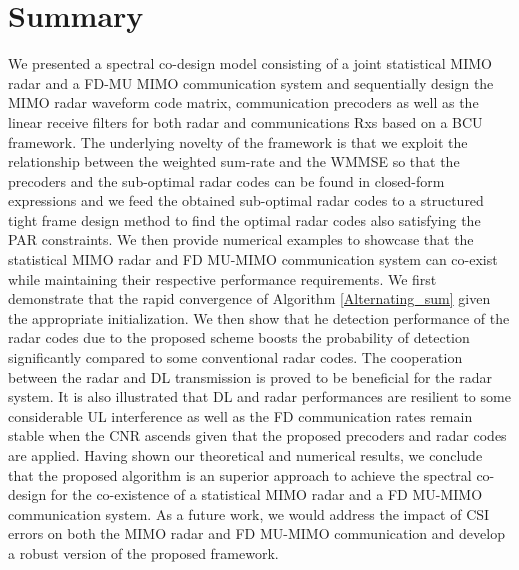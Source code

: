 \documentclass[9pt,journal]{IEEEtran}
\begin{document}
\section{Summary}
\label{sec:conclusion}
We presented a spectral co-design model consisting of a joint statistical MIMO radar and a FD-MU MIMO communication system and sequentially design the MIMO radar waveform code matrix, communication precoders as well as the linear receive filters for both radar and communications Rxs based on a BCU framework. The underlying novelty of the framework is that we exploit the relationship between the weighted sum-rate and the WMMSE so that the precoders and the sub-optimal radar codes can be found in closed-form expressions and we feed the obtained sub-optimal radar codes to a structured tight frame design method to find the optimal radar codes also satisfying the PAR constraints.  We then provide numerical examples to showcase that the statistical MIMO radar and FD MU-MIMO communication system can co-exist while maintaining their respective performance requirements. We first demonstrate that the rapid convergence of Algorithm \ref{Alternating_sum} given the appropriate initialization. We then show that he detection performance of the radar codes due to the proposed scheme boosts the probability of detection significantly compared to some conventional radar codes. The cooperation between the radar and DL transmission is proved to be beneficial for the radar system. It is also illustrated that DL and radar performances are resilient to some considerable UL interference as well as the FD communication rates remain stable when the CNR ascends given that the proposed precoders and radar codes are applied. Having shown our theoretical and numerical results, we conclude that the proposed algorithm is an superior approach to achieve the spectral co-design for the co-existence of a statistical MIMO radar and a FD MU-MIMO communication system. As a future work, we would address the impact of CSI errors on both the MIMO radar and FD MU-MIMO communication and develop a robust version of the
proposed framework.
\end{document}
